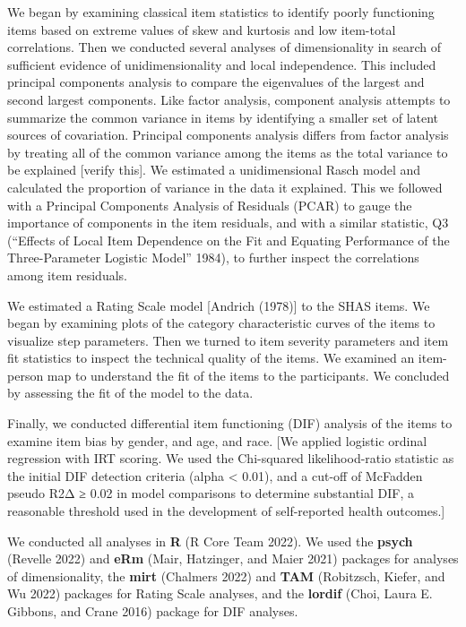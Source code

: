 \documentclass[
  letterpaper,
]{article}
\begin{document}
We began by examining classical item statistics to identify poorly
functioning items based on extreme values of skew and kurtosis and low
item-total correlations. Then we conducted several analyses of
dimensionality in search of sufficient evidence of unidimensionality and
local independence. This included principal components analysis to
compare the eigenvalues of the largest and second largest components.
Like factor analysis, component analysis attempts to summarize the
common variance in items by identifying a smaller set of latent sources
of covariation. Principal components analysis differs from factor
analysis by treating all of the common variance among the items as the
total variance to be explained {[}verify this{]}. We estimated a
unidimensional Rasch model and calculated the proportion of variance in
the data it explained. This we followed with a Principal Components
Analysis of Residuals (PCAR) to gauge the importance of components in
the item residuals, and with a similar statistic, Q3 ({``Effects of
Local Item Dependence on the Fit and Equating Performance of the
Three-Parameter Logistic Model''} 1984), to further inspect the
correlations among item residuals.

We estimated a Rating Scale model {[}Andrich (1978){]} to the SHAS
items. We began by examining plots of the category characteristic curves
of the items to visualize step parameters. Then we turned to item
severity parameters and item fit statistics to inspect the technical
quality of the items. We examined an item-person map to understand the
fit of the items to the participants. We concluded by assessing the fit
of the model to the data.

Finally, we conducted differential item functioning (DIF) analysis of
the items to examine item bias by gender, and age, and race. {[}We
applied logistic ordinal regression with IRT scoring. We used the
Chi-squared likelihood-ratio statistic as the initial DIF detection
criteria (alpha \textless{} 0.01), and a cut-off of McFadden pseudo R2Δ
≥ 0.02 in model comparisons to determine substantial DIF, a reasonable
threshold used in the development of self-reported health outcomes.{]}

We conducted all analyses in \textbf{R} (R Core Team 2022). We used the
\textbf{psych} (Revelle 2022) and \textbf{eRm} (Mair, Hatzinger, and
Maier 2021) packages for analyses of dimensionality, the \textbf{mirt}
(Chalmers 2022) and \textbf{TAM} (Robitzsch, Kiefer, and Wu 2022)
packages for Rating Scale analyses, and the \textbf{lordif} (Choi, Laura
E. Gibbons, and Crane 2016) package for DIF analyses.
\end{document}
